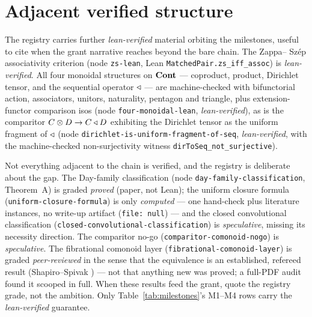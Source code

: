 \section{Adjacent verified structure}\label{sec:mile-adjacent}

The registry carries further \emph{lean-verified} material orbiting the milestones,
useful to cite when the grant narrative reaches beyond the bare chain. The Zappa--
Sz\'ep associativity criterion (node \texttt{zs-lean}, Lean
\texttt{MatchedPair.zs\_iff\_assoc}) is \emph{lean-verified}. All four monoidal
structures on $\mathbf{Cont}$ --- coproduct, product, Dirichlet tensor, and the sequential
operator $\triangleleft$ --- are machine-checked with bifunctorial action, associators,
unitors, naturality, pentagon and triangle, plus extension-functor comparison isos
(node \texttt{four-monoidal-lean}, \emph{lean-verified}), as is the comparitor
$C\otimes D\to C\triangleleft D$ exhibiting the Dirichlet tensor as the uniform fragment of
$\triangleleft$ (node \texttt{dirichlet-is-uniform-fragment-of-seq}, \emph{lean-verified},
with the machine-checked non-surjectivity witness \texttt{dirToSeq\_not\_surjective}).

\begin{remark}\label{rem:mile-mixed}
Not everything adjacent to the chain is verified, and the registry is deliberate
about the gap. The Day-family classification (node \texttt{day-family-classification},
Theorem~A) is graded \emph{proved} (paper, not Lean); the uniform closure formula
(\texttt{uniform-closure-formula}) is only \emph{computed} --- one hand-check plus
literature instances, no write-up artifact (\texttt{file: null}) --- and the closed
convolutional classification (\texttt{closed-convolutional-classification}) is
\emph{speculative}, missing its necessity direction. The comparitor no-go
(\texttt{comparitor-comonoid-nogo}) is \emph{speculative}. The fibrational comonoid
layer (\texttt{fibrational-comonoid-layer}) is graded \emph{peer-reviewed} in the
sense that the equivalence is an established, refereed result
(Shapiro--Spivak \cite{SS23}) --- not that anything new was proved; a full-PDF audit
found it scooped in full. When these results feed the grant, quote the registry
grade, not the ambition. Only Table~\ref{tab:milestones}'s M1--M4 rows carry the
\emph{lean-verified} guarantee.
\end{remark}

